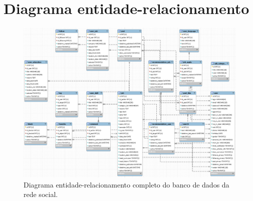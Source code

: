 \appendix

\chapter{Diagrama entidade-relacionamento}
\label{appendDER}
\begin{figure}[ht]
    \caption{Diagrama entidade-relacionamento completo do banco de dados da rede social.}
       	\begin{center}
            \includegraphics[width=1\textwidth]{figuras/der-completo.png}
        \end{center}
    \label{appendDERimg}
\end{figure}

